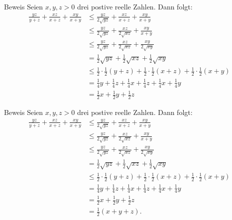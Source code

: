 \documentclass[10pt]{beamer}
\begin{document}
\begin{frame}{Beweis}
    Seien \( x, y, z > 0 \) drei postive reelle Zahlen. Dann folgt:
    \begin{align*}
        \frac{yz}{y + z} + \frac{xz}{x + z} + \frac{xy}{x + y}
        & \leq \frac{yz}{2\sqrt{yz}} + \frac{xz}{x + z} + \frac{xy}{x + y} \\
        & \leq \frac{yz}{2\sqrt{yz}} + \frac{xz}{2\sqrt{xz}} + \frac{xy}{x + y} \\
        & \leq \frac{yz}{2\sqrt{yz}} + \frac{xz}{2\sqrt{xz}} + \frac{xy}{2\sqrt{xy}} \\
        & = \frac{1}{2}\sqrt{yz} + \frac{1}{2}\sqrt{xz} + \frac{1}{2}\sqrt{xy} \\
        & \leq \frac{1}{2} \cdot \frac{1}{2} \left( y + z \right) + \frac{1}{2} \cdot \frac{1}{2} \left( x + z \right) + \frac{1}{2} \cdot \frac{1}{2} \left( x + y \right) \\
        & = \frac{1}{4}y + \frac{1}{4}z + \frac{1}{4}x + \frac{1}{4}z + \frac{1}{4}x + \frac{1}{4}y \\
        & = \frac{1}{2}x + \frac{1}{2}y + \frac{1}{2}z
    \end{align*}
\end{frame}



\begin{frame}{Beweis}
    Seien \( x, y, z > 0 \) drei postive reelle Zahlen. Dann folgt:
    \begin{align*}
        \frac{yz}{y + z} + \frac{xz}{x + z} + \frac{xy}{x + y}
        & \leq \frac{yz}{2\sqrt{yz}} + \frac{xz}{x + z} + \frac{xy}{x + y} \\
        & \leq \frac{yz}{2\sqrt{yz}} + \frac{xz}{2\sqrt{xz}} + \frac{xy}{x + y} \\
        & \leq \frac{yz}{2\sqrt{yz}} + \frac{xz}{2\sqrt{xz}} + \frac{xy}{2\sqrt{xy}} \\
        & = \frac{1}{2}\sqrt{yz} + \frac{1}{2}\sqrt{xz} + \frac{1}{2}\sqrt{xy} \\
        & \leq \frac{1}{2} \cdot \frac{1}{2} \left( y + z \right) + \frac{1}{2} \cdot \frac{1}{2} \left( x + z \right) + \frac{1}{2} \cdot \frac{1}{2} \left( x + y \right) \\
        & = \frac{1}{4}y + \frac{1}{4}z + \frac{1}{4}x + \frac{1}{4}z + \frac{1}{4}x + \frac{1}{4}y \\
        & = \frac{1}{2}x + \frac{1}{2}y + \frac{1}{2}z \\
        & = \frac{1}{2} \left( x + y + z \right).
    \end{align*}
\end{frame}
\end{document}
